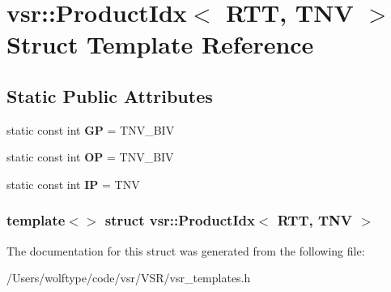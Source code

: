 \hypertarget{structvsr_1_1_product_idx_3_01_r_t_t_00_01_t_n_v_01_4}{\section{vsr\-:\-:Product\-Idx$<$ R\-T\-T, T\-N\-V $>$ Struct Template Reference}
\label{structvsr_1_1_product_idx_3_01_r_t_t_00_01_t_n_v_01_4}
}
\subsection*{Static Public Attributes}
\begin{DoxyCompactItemize}
\item 
\hypertarget{structvsr_1_1_product_idx_3_01_r_t_t_00_01_t_n_v_01_4_a079af3f47dff3d12bd624c60085b77ce}{static const int {\bfseries G\-P} = T\-N\-V\-\_\-\-B\-I\-V}\label{structvsr_1_1_product_idx_3_01_r_t_t_00_01_t_n_v_01_4_a079af3f47dff3d12bd624c60085b77ce}

\item 
\hypertarget{structvsr_1_1_product_idx_3_01_r_t_t_00_01_t_n_v_01_4_a201673e7f24e9f10a6a1206135fa682b}{static const int {\bfseries O\-P} = T\-N\-V\-\_\-\-B\-I\-V}\label{structvsr_1_1_product_idx_3_01_r_t_t_00_01_t_n_v_01_4_a201673e7f24e9f10a6a1206135fa682b}

\item 
\hypertarget{structvsr_1_1_product_idx_3_01_r_t_t_00_01_t_n_v_01_4_ae69e07d62de9b87cd02da6f33deec86f}{static const int {\bfseries I\-P} = T\-N\-V}\label{structvsr_1_1_product_idx_3_01_r_t_t_00_01_t_n_v_01_4_ae69e07d62de9b87cd02da6f33deec86f}

\end{DoxyCompactItemize}
\subsubsection*{template$<$$>$ struct vsr\-::\-Product\-Idx$<$ R\-T\-T, T\-N\-V $>$}



The documentation for this struct was generated from the following file\-:\begin{DoxyCompactItemize}
\item 
/\-Users/wolftype/code/vsr/\-V\-S\-R/vsr\-\_\-templates.\-h\end{DoxyCompactItemize}
